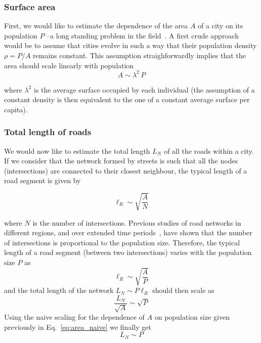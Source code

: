 \subsubsection{Surface area} 

First, we would like to estimate the dependence of the area $A$ of a city on its population $P$ --a long standing problem in the field~\cite{Makse:1995}. A first crude approach would be to assume that cities evolve in such a way that their population density $\rho = P/A$ remains constant. This assumption straighforwardly implies that the area should scale linearly with population
%
\begin{equation}
A \sim \lambda^2\, P
\label{eq:area_naive}
\end{equation}

where $\lambda^2$ is the average surface occupied by each individual (the assumption of a constant density is then equivalent to the one of a constant average surface per capita).

\subsubsection{Total length of roads} 

We would now like to estimate the total length $L_N$ of all the roads within a city. If we consider that the network formed by streets is such that all the nodes (intersections) are connected to their closest neighbour, the typical length of a road segment is given by

\begin{equation}
\ell_R \sim \sqrt{\frac{A}{N}}
\end{equation}

where $N$ is the number of intersections. Previous studies of road networks in different regions, and over extended time periods~\cite{Strano:2012,Barthelemy:2013}, have shown that the number of intersections is proportional to the population size. Therefore, the typical length of a road segment (between two intersections) varies with the population size $P$ as
%
\begin{equation}
\ell_R \sim \sqrt{\frac{A}{P}}
\end{equation}
%
and the total length of the network $L_N \sim P\ell_R$ should then scale as
%
\begin{equation}
\frac{L_N}{\sqrt{A}}\sim\sqrt{P}
\end{equation}
%
Using the naive scaling for the dependence of $A$ on population size given previously in Eq.~\ref{eq:area_naive} we finally get
\begin{equation}
L_N \sim P
\end{equation}

